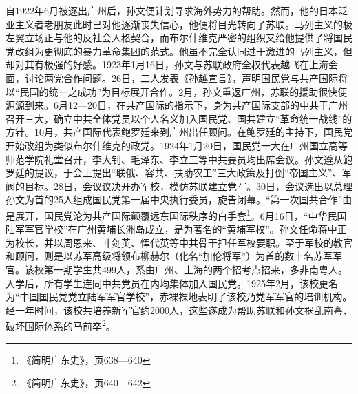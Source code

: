 自1922年6月被逐出广州后，孙文便计划寻求海外势力的帮助。然而，他的日本泛亚主义者老朋友此时已对他逐渐丧失信心，他便将目光转向了苏联。马列主义的极左翼立场正与他的反社会人格契合，而布尔什维克严密的组织又给他提供了将国民党改组为更彻底的暴力革命集团的范式。他虽不完全认同过于激进的马列主义，但却对其有极强的好感。1923年1月16日，孙文与苏联政府全权代表越飞在上海会面，讨论两党合作问题。26日，二人发表《孙越宣言》，声明国民党与共产国际将以“民国的统一之成功”为目标展开合作。2月，孙文重返广州，苏联的援助很快便源源到来。6月12—20日，在共产国际的指示下，身为共产国际支部的中共于广州召开三大，确立中共全体党员以个人名义加入国民党、国共建立“革命统一战线”的方针。10月，共产国际代表鲍罗廷来到广州出任顾问。在鲍罗廷的主持下，国民党开始改组为类似布尔什维克的政党。1924年1月20日，国民党一大在广州国立高等师范学院礼堂召开，李大钊、毛泽东、李立三等中共要员均出席会议。孙文遵从鲍罗廷的提议，于会上提出“联俄、容共、扶助农工”三大政策及打倒“帝国主义”、军阀的目标。28日，会议议决开办军校，模仿苏联建立党军。30日，会议选出以总理孙文为首的25人组成国民党第一届中央执行委员，旋告闭幕。“第一次国共合作”由是展开，国民党沦为共产国际颠覆远东国际秩序的白手套\footnote{《简明广东史》，页638—640}。6月16日，“中华民国陆军军官学校”在广州黄埔长洲岛成立，是为著名的“黄埔军校”。孙文任命蒋中正为校长，并以周恩来、叶剑英、恽代英等中共骨干担任军校要职。至于军校的教官和顾问，则是以苏军高级将领布柳赫尔（化名“加伦将军”）为首的数十名苏军军官。该校第一期学生共499人，系由广州、上海的两个招考点招来，多非南粤人。入学后，所有学生连同中共党员在内均集体加入国民党。1925年2月，该校更名为“中国国民党党立陆军军官学校”，赤裸裸地表明了该校乃党军军官的培训机构。经一年时间，该校共培养新军官约2000人，这些遂成为帮助苏联和孙文祸乱南粤、破坏国际体系的马前卒\footnote{《简明广东史》，页640—642}。

